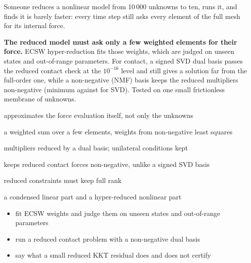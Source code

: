 \newpage\thispagestyle{hl}
\begin{hlquote}Someone reduces a nonlinear model from 10\,000 unknowns to ten, runs it, and finds it is barely faster: every time step still asks every element of the full mesh for its internal force.\end{hlquote}
\vspace{8pt}\begin{hlsum}\textbf{The reduced model must ask only a few weighted elements for their force.} ECSW hyper-reduction fits those weights, which are judged on unseen states and out-of-range parameters. For contact, a signed SVD dual basis passes the reduced contact check at the $10^{-16}$ level and still gives a solution far from the full-order one, while a non-negative (NMF) basis keeps the reduced multipliers non-negative (minimum \chdNmfTenTrMinLam{} against \chdSvdTenTrMinLam{} for SVD). Tested on one small frictionless membrane of \chdN{} unknowns.\end{hlsum}
\begin{description}\setlength\itemsep{5pt}\setlength\parsep{0pt}\renewcommand{\descriptionlabel}[1]{\hspace{\labelsep}\sffamily\bfseries\color{hlnavy}#1}
\item[Hyper-reduction] approximates the force evaluation itself, not only the unknowns
\item[ECSW] a weighted sum over a few elements, weights from non-negative least squares
\item[Reduced contact problem] multipliers reduced by a dual basis; unilateral conditions kept
\item[Non-negative dual basis] keeps reduced contact forces non-negative, unlike a signed SVD basis
\item[Rank condition] reduced constraints must keep full rank
\item[Linear and nonlinear zones] a condensed linear part and a hyper-reduced nonlinear part
\end{description}
\begin{itemize}\setlength\itemsep{3pt}
\item fit ECSW weights and judge them on unseen states and out-of-range parameters
\item run a reduced contact problem with a non-negative dual basis
\item say what a small reduced KKT residual does and does not certify
\end{itemize}
